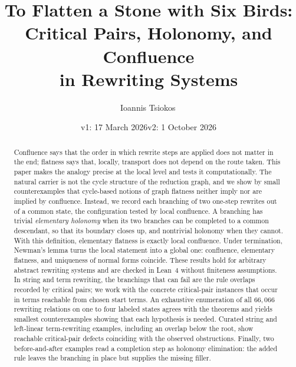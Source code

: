 \documentclass[11pt]{article}
\title{To Flatten a Stone with Six Birds:\\[4pt]
Critical Pairs, Holonomy, and Confluence\\
in Rewriting Systems}
\author{Ioannis Tsiokos\,\orcidA{}}
\date{v1: 17 March 2026\qquad v2: 1 October 2026}
\begin{document}
\maketitle
\thispagestyle{firstpage}

\begin{abstract}
\noindent
Confluence says that the order in which rewrite steps are applied does not matter in the end; flatness says that, locally, transport does not depend on the route taken. This paper makes the analogy precise at the local level and tests it computationally. The natural carrier is not the cycle structure of the reduction graph, and we show by small counterexamples that cycle-based notions of graph flatness neither imply nor are implied by confluence. Instead, we record each branching of two one-step rewrites out of a common state, the configuration tested by local confluence. A branching has trivial \emph{elementary holonomy} when its two branches can be completed to a common descendant, so that its boundary closes up, and nontrivial holonomy when they cannot. With this definition, elementary flatness is exactly local confluence. Under termination, Newman's lemma turns the local statement into a global one: confluence, elementary flatness, and uniqueness of normal forms coincide. These results hold for arbitrary abstract rewriting systems and are checked in Lean~4 without finiteness assumptions. In string and term rewriting, the branchings that can fail are the rule overlaps recorded by critical pairs; we work with the concrete critical-pair instances that occur in terms reachable from chosen start terms. An exhaustive enumeration of all $66{,}066$ rewriting relations on one to four labeled states agrees with the theorems and yields smallest counterexamples showing that each hypothesis is needed. Curated string and left-linear term-rewriting examples, including an overlap below the root, show reachable critical-pair defects coinciding with the observed obstructions. Finally, two before-and-after examples read a completion step as holonomy elimination: the added rule leaves the branching in place but supplies the missing filler.
\end{abstract}












\appendix
{}








\end{document}
